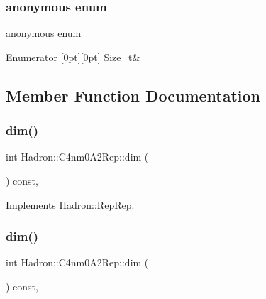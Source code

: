 \subsubsection{\texorpdfstring{anonymous enum}{anonymous enum}}
{\footnotesize\ttfamily anonymous enum}

\begin{DoxyEnumFields}{Enumerator}
[0pt][0pt]{}\mbox{\label{structHadron_1_1C4nm0A2Rep_a76572eace86a1b48cebefcaa36eae3ceab63c757650d4c13ff14f0c857c9ac201}} 
Size\+\_\+t&\\
\hline

\end{DoxyEnumFields}


\subsection{Member Function Documentation}
\mbox{\label{structHadron_1_1C4nm0A2Rep_ad3e51768eee5d4652aa8ceae670d6fb9}} 
\subsubsection{\texorpdfstring{dim()}{dim()}\hspace{0.1cm}{\footnotesize\ttfamily [1/5]}}
{\footnotesize\ttfamily int Hadron\+::\+C4nm0\+A2\+Rep\+::dim (\begin{DoxyParamCaption}{ }\end{DoxyParamCaption}) const\hspace{0.3cm}{\ttfamily [inline]}, {\ttfamily [virtual]}}



Implements \mbox{\hyperlink{structHadron_1_1RepRep_a92c8802e5ed7afd7da43ccfd5b7cd92b}{Hadron\+::\+Rep\+Rep}}.

\mbox{\label{structHadron_1_1C4nm0A2Rep_ad3e51768eee5d4652aa8ceae670d6fb9}} 
\subsubsection{\texorpdfstring{dim()}{dim()}\hspace{0.1cm}{\footnotesize\ttfamily [2/5]}}
{\footnotesize\ttfamily int Hadron\+::\+C4nm0\+A2\+Rep\+::dim (\begin{DoxyParamCaption}{ }\end{DoxyParamCaption}) const\hspace{0.3cm}{\ttfamily [inline]}, {\ttfamily [virtual]}}



